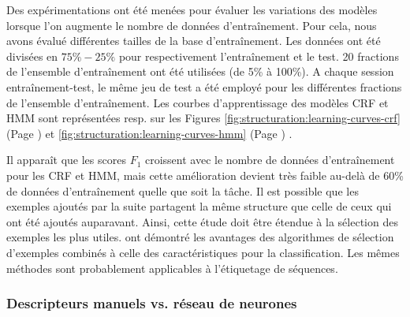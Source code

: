 Des expérimentations ont été menées pour évaluer les variations des modèles lorsque l'on augmente le nombre de données d'entraînement. Pour cela, nous avons évalué différentes tailles de la base d'entraînement. Les données ont été divisées en $75\%-25\%$ pour respectivement l'entraînement et le test. 20 fractions de l'ensemble d'entraînement ont été utilisées  (de 5\% à 100\%). A chaque session entraînement-test, le même jeu de test a été employé pour les différentes fractions de l'ensemble d'entraînement. Les courbes d'apprentissage des modèles CRF et HMM sont représentées resp. sur les Figures \ref{fig:structuration:learning-curves-crf} (Page \pageref{fig:structuration:learning-curves-crf}) et \ref{fig:structuration:learning-curves-hmm} (Page \pageref{fig:structuration:learning-curves-hmm}) . 



Il apparaît que les scores $F_1$ croissent avec le nombre de données d'entraînement pour les CRF et HMM, mais cette amélioration devient très faible au-delà de 60\% de données d'entraînement quelle que soit la tâche. Il est possible que les exemples ajoutés par la suite partagent la même structure que celle de ceux qui ont été ajoutés auparavant. Ainsi, cette étude doit être étendue à la sélection des exemples les plus utiles. \citet{raman2003exampleSelection} ont démontré les avantages des algorithmes de sélection d'exemples combinés à celle des caractéristiques pour la classification. Les mêmes méthodes sont probablement applicables à l'étiquetage de séquences.



\subsubsection{Descripteurs manuels vs. réseau de neurones}

